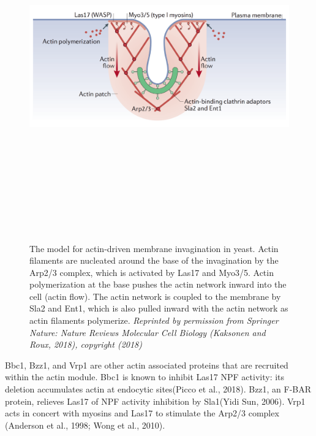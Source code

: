 


	\begin{figure}[H]
	\centering
		\includegraphics[width=14cm, height=15cm, keepaspectratio]{figures/intro/actin_kaksonen}
	\caption[Actin network in endocytosis]
	{The model for actin-driven membrane invagination in yeast. Actin filaments are nucleated around the base of the invagination by the Arp2/3 complex, which is activated by Las17 and Myo3/5. Actin polymerization at the base pushes the actin network inward into the cell (actin flow). The actin network is coupled to the membrane by Sla2 and Ent1, which is also pulled inward with the actin network as actin filaments polymerize. \textit{Reprinted by permission from Springer Nature: Nature Reviews Molecular Cell Biology (Kaksonen and Roux, 2018), copyright (2018)
	\label{intro_actin_netork}}}
\end{figure}


		\vspace{5mm}
Bbc1, Bzz1, and Vrp1 are other actin associated proteins that are recruited within the actin module. Bbc1 is known to inhibit Las17 NPF activity: its deletion accumulates actin at endocytic sites(Picco et al., 2018). Bzz1, an F-BAR protein, relieves Las17 of NPF activity inhibition by Sla1(Yidi Sun, 2006). Vrp1 acts in concert with myosins and Las17 to stimulate the Arp2/3 complex (Anderson et al., 1998; Wong et al., 2010). 

